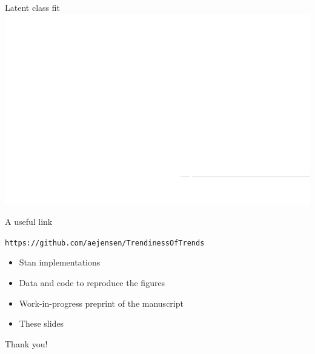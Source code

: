 \documentclass[ignorenonframetext,xcolor=pdflatex,table,dvipsnames,serif]{beamer}
\begin{document}
\begin{frame}{Latent class fit}
\center\includegraphics[scale=0.5]{smoking2-1}
\end{frame}


\begin{frame}{A useful link}



\texttt{https://github.com/aejensen/TrendinessOfTrends}

\begin{itemize}
  \item[\Coffeecup]{Stan implementations}
  \item[\Coffeecup]{Data and code to reproduce the figures}
  \item[\Coffeecup]{Work-in-progress preprint of the manuscript}
  \item[\Coffeecup]{These slides}
\end{itemize}

\end{frame}



\begin{frame}
\center \Huge Thank you!
\end{frame}
\end{document}
